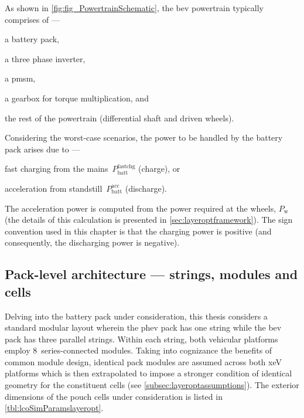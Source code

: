 As  shown   in  \cref{fig:fig_PowertrainSchematic},  the   \gls{bev}  powertrain
typically comprises of ---
\begin{enumerate*}[label=\itshape\alph*\upshape)]
    \item a battery pack,
    \item a three phase inverter,
    \item a \gls{pmsm},
    \item a gearbox for  torque multiplication, and
    \item the rest of the  powertrain  (differential shaft  and driven  wheels).
\end{enumerate*}
Considering the  worst-case scenarios, the  power to  be handled by  the battery
pack arises due to  ---
\begin{enumerate*}[label=\roman*)]
    \item fast charging from  the mains~$P^\text{fastchg}_\text{batt}$ (charge), or
    \item acceleration  from standstill~$P^\text{acc}_\text{batt}$ (discharge).
\end{enumerate*}
The   acceleration  power   is  computed   from  the   power  required   at  the
wheels,  $P_\text{w}$  (the   details  of  this  calculation   is  presented  in
\cref{sec:layeroptframework}). The sign convention used  in this chapter is that
the  charging power  is positive  (and  consequently, the  discharging power  is
negative).

\subsection{Pack-level architecture --- strings, modules and cells}

Delving  into the  battery pack  under  consideration, this  thesis considers  a
standard  modular  layout wherein  the  \gls{phev}  pack  has one  string  while
the  \gls{bev}  pack  has  three  parallel strings.  Within  each  string,  both
vehicular platforms  employ 8~series-connected  modules. Taking  into cognizance
the  benefits  of common  module  design,  identical  pack modules  are  assumed
across  both  \gls{xeV}  platforms  which  is  then  extrapolated  to  impose  a
stronger  condition  of  identical  geometry  for  the  constituent  cells  (see
\cref{subsec:layeroptassumptions}). The exterior dimensions of the pouch cells
under consideration is listed in \cref{tbl:lcoSimParamslayeropt}.

